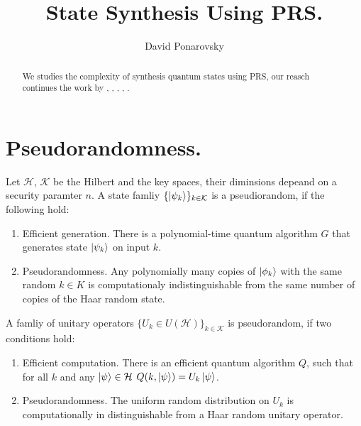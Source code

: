 \documentclass[manuscript,screen,review]{acmart}
\begin{document}

\title{State Synthesis Using PRS.} 
\author{David Ponarovsky}
\maketitle

\begin{abstract}
  We studies the complexity of synthesis quantum states using PRS, our reasch continues the work by \cite{searchtodecision}, \cite{rosenthal2023efficient}, \cite{rosenthal2021interactive}, \cite{metger2023stateqip}, \cite{delavenne2023quantum}.
\end{abstract}

\section{Pseudorandomness.}

\begin{definition} Let $\mathcal{H}$, $\mathcal{K}$ be the Hilbert and the key spaces, their diminsions depeand on a security paramter $n$. A state famliy $\{\ket{\psi_{k}}\}_{k\in \mathcal{K}}$ is a pseudiorandom, if the following hold:
  \begin{enumerate}
    \item Efficient generation. There is a polynomial-time quantum algorithm $G$ that generates state $\ket{\psi_{k}}$ on input $k$. 
    \item Pseudorandomness. Any polynomially many copies of $\ket{\phi_{k}}$ with the same random $k\in K$ is computationaly indistinguishable from the same number of copies of the Haar random state. 
  \end{enumerate}
\end{definition}

\begin{definition} A famliy of unitary operators $\{ U_{k} \in U(\mathcal{H}) \}_{k \in \mathcal{K}}$ is pseudorandom, if two conditions hold: 
  \begin{enumerate}
    \item Efficient computation. There is an efficient quantum algorithm $Q$, such that for all $k$ and any $\ket{\psi} \in \mathcal{H}$ $Q(k,\ket{\psi}) = U_{k}\ket{\psi}$. 
    \item Pseudorandomness. The uniform random distribution on $U_{k}$ is computationally in distinguishable from a Haar random unitary operator. 
  \end{enumerate} 
\end{definition}
\end{document}
